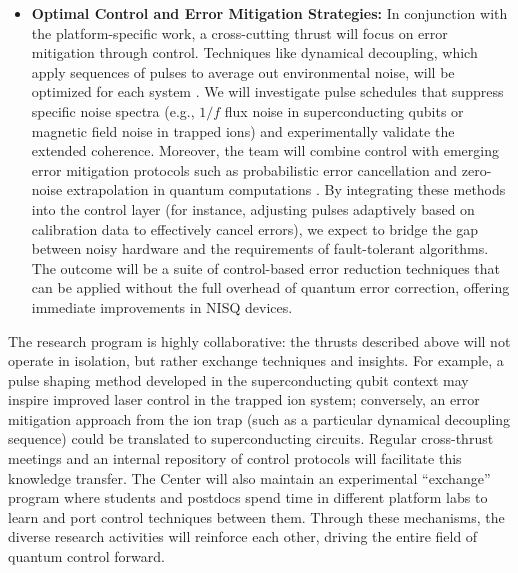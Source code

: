 \documentclass[11pt]{article}
\begin{document}
\begin{itemize}
   \item \textbf{Optimal Control and Error Mitigation Strategies:} In conjunction with the platform-specific work, a cross-cutting thrust will focus on error mitigation through control. Techniques like dynamical decoupling, which apply sequences of pulses to average out environmental noise, will be optimized for each system \cite{Viola99}. We will investigate pulse schedules that suppress specific noise spectra (e.g., $1/f$ flux noise in superconducting qubits or magnetic field noise in trapped ions) and experimentally validate the extended coherence. Moreover, the team will combine control with emerging error mitigation protocols such as probabilistic error cancellation and zero-noise extrapolation in quantum computations \cite{Cai23}. By integrating these methods into the control layer (for instance, adjusting pulses adaptively based on calibration data to effectively cancel errors), we expect to bridge the gap between noisy hardware and the requirements of fault-tolerant algorithms. The outcome will be a suite of control-based error reduction techniques that can be applied without the full overhead of quantum error correction, offering immediate improvements in NISQ devices.
\end{itemize}

The research program is highly collaborative: the thrusts described above will not operate in isolation, but rather exchange techniques and insights. For example, a pulse shaping method developed in the superconducting qubit context may inspire improved laser control in the trapped ion system; conversely, an error mitigation approach from the ion trap (such as a particular dynamical decoupling sequence) could be translated to superconducting circuits. Regular cross-thrust meetings and an internal repository of control protocols will facilitate this knowledge transfer. The Center will also maintain an experimental “exchange” program where students and postdocs spend time in different platform labs to learn and port control techniques between them. Through these mechanisms, the diverse research activities will reinforce each other, driving the entire field of quantum control forward.
\end{document}
